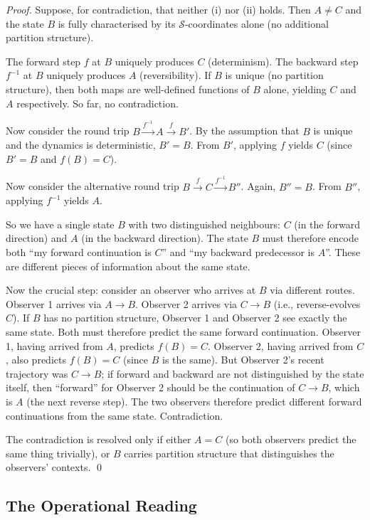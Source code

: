 \documentclass[twocolumn,10pt,a4paper]{article}
\theoremstyle{definition}
\theoremstyle{remark}
\newcommand{\StateSpace}{\mathcal{S}}
\begin{document}
\begin{proof}
Suppose, for contradiction, that neither (i) nor (ii) holds. Then $A \neq C$ and the state $B$ is fully characterised by its $\StateSpace$-coordinates alone (no additional partition structure).

The forward step $f$ at $B$ uniquely produces $C$ (determinism). The backward step $f^{-1}$ at $B$ uniquely produces $A$ (reversibility). If $B$ is unique (no partition structure), then both maps are well-defined functions of $B$ alone, yielding $C$ and $A$ respectively. So far, no contradiction.

Now consider the round trip $B \xrightarrow{f^{-1}} A \xrightarrow{f} B'$. By the assumption that $B$ is unique and the dynamics is deterministic, $B' = B$. From $B'$, applying $f$ yields $C$ (since $B' = B$ and $f(B) = C$).

Now consider the alternative round trip $B \xrightarrow{f} C \xrightarrow{f^{-1}} B''$. Again, $B'' = B$. From $B''$, applying $f^{-1}$ yields $A$.

So we have a single state $B$ with two distinguished neighbours: $C$ (in the forward direction) and $A$ (in the backward direction). The state $B$ must therefore encode both ``my forward continuation is $C$'' and ``my backward predecessor is $A$''. These are different pieces of information about the same state.

Now the crucial step: consider an observer who arrives at $B$ via different routes. Observer 1 arrives via $A \to B$. Observer 2 arrives via $C \to B$ (i.e., reverse-evolves $C$). If $B$ has no partition structure, Observer 1 and Observer 2 see exactly the same state. Both must therefore predict the same forward continuation. Observer 1, having arrived from $A$, predicts $f(B) = C$. Observer 2, having arrived from $C$, also predicts $f(B) = C$ (since $B$ is the same). But Observer 2's recent trajectory was $C \to B$; if forward and backward are not distinguished by the state itself, then ``forward'' for Observer 2 should be the continuation of $C \to B$, which is $A$ (the next reverse step). The two observers therefore predict different forward continuations from the same state. Contradiction.

The contradiction is resolved only if either $A = C$ (so both observers predict the same thing trivially), or $B$ carries partition structure that distinguishes the observers' contexts. \qed
\end{proof}

\subsection{The Operational Reading}
\end{document}
